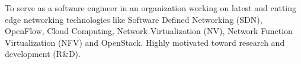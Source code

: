 

\begin{cvparagraph}

To serve as a software engineer in an organization working on latest and cutting edge
networking technologies like Software Defined Networking (SDN), OpenFlow, Cloud
Computing, Network Virtualization (NV), Network Function Virtualization (NFV) and 
OpenStack. Highly motivated toward research and development (R\&D).
\end{cvparagraph}
